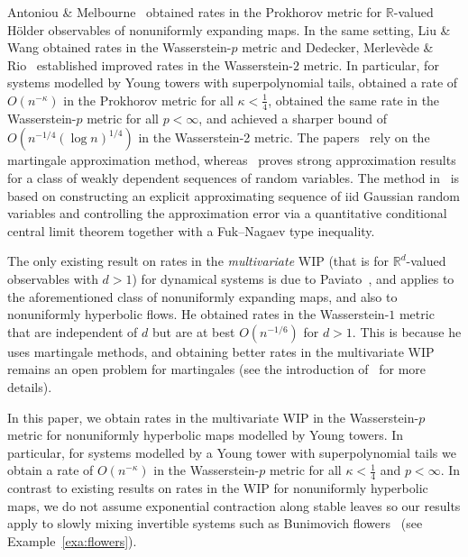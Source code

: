 \documentclass[11pt,a4paper,reqno,oneside]{amsart}
\newcommand{\R}{\ensuremath{\mathbb{R}}}%
\theoremstyle{definition}
\theoremstyle{remark}
\numberwithin{equation}{section}
\begin{document}
Antoniou \& Melbourne~\cite{antoniou_melbourne} obtained rates in the Prokhorov metric for $\R$-valued H\"older observables of nonuniformly expanding maps. In the same setting, Liu \& Wang \cite{liu_wang_stationary} obtained rates in the Wasserstein-$p$ metric and Dedecker, Merlev\`ede \& Rio~\cite{dedecker_merlevede_rio} established improved rates in the Wasserstein-$2$ metric. In particular, for systems modelled by Young towers with superpolynomial tails, \cite{antoniou_melbourne} obtained a rate of $O(n^{-\kappa})$ in the Prokhorov metric for all $\kappa<\frac{1}{4}$, \cite{liu_wang_stationary} obtained the same rate in the Wasserstein-$p$ metric for all $p<\infty$, and \cite{dedecker_merlevede_rio} achieved a sharper bound of $O(n^{-1/4}(\log n)^{1/4})$ in the Wasserstein-2 metric. The papers~\cite{antoniou_melbourne,liu_wang_stationary} rely on the martingale approximation method, whereas~\cite{dedecker_merlevede_rio} proves strong approximation results for a class of weakly dependent sequences of random variables. The method in~\cite{dedecker_merlevede_rio} is based on constructing an explicit approximating sequence of iid Gaussian random variables and controlling the approximation error via a quantitative conditional central limit theorem together with a Fuk–Nagaev type inequality.

The only existing result on rates in the \emph{multivariate} WIP (that is for $\R^d$-valued observables with $d>1$) for dynamical systems is due to Paviato~\cite{paviato_rates_article}, and applies to the aforementioned class of nonuniformly expanding maps, and also to nonuniformly hyperbolic flows. He obtained rates in the Wasserstein-$1$ metric that are independent of $d$ but are
at best $O(n^{-1/6})$ for $d > 1$. This is because he uses martingale methods, and obtaining better rates in the multivariate WIP remains an open problem for martingales (see the introduction of~\cite{multidim_martingale_asip} for more details).

In this paper, we obtain rates in the multivariate WIP in the Wasserstein-$p$ metric for nonuniformly hyperbolic maps modelled by Young towers. In particular, for systems modelled by a Young tower with superpolynomial tails we obtain a rate of $O(n^{-\kappa})$ in the Wasserstein-$p$ metric for all $\kappa<\frac{1}{4}$ and $p<\infty$. In contrast to existing results on rates in the WIP for nonuniformly hyperbolic maps, we do not assume exponential contraction along stable leaves so our results apply to slowly mixing invertible systems such as Bunimovich flowers~\cite{bunimovich_flowers} (see Example~\ref{exa:flowers}).
\end{document}

